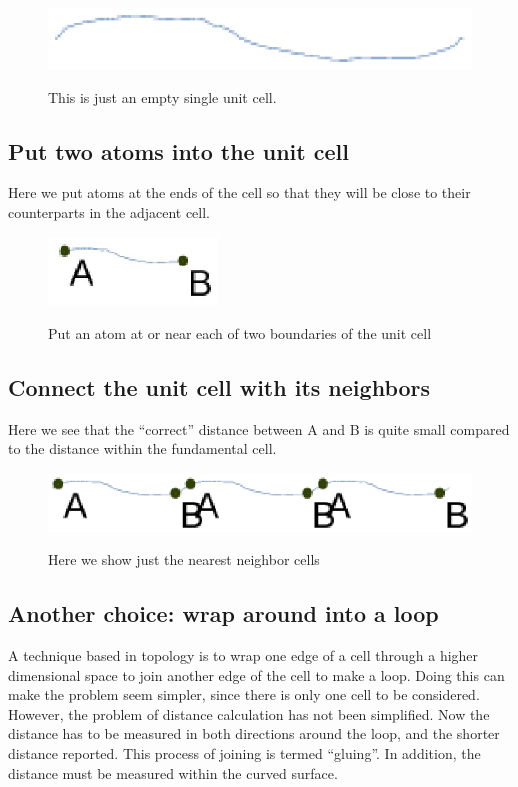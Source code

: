 \documentclass[preprint]{iucr}              %
\numberwithin{equation}{section}
\begin{document}
\begin{figure}
	\includegraphics[width=\textwidth]{line_1}
	\label{line_1}
	\caption{This is just an empty single unit cell.}
\end{figure}

\subsection{Put two atoms into the unit cell}
	
	Here we put atoms at the ends of the cell so that they
	will be close to their counterparts in the adjacent cell.
\begin{figure}
	\includegraphics[width=0.4\textwidth]{line_2a}
	\label{line_2}
	\caption{Put an atom at or near each of two boundaries of the unit cell}
\end{figure}

\subsection{Connect the unit cell with its neighbors}
	
	Here we see that the ``correct'' distance between A and B is
	quite small compared to the distance within the 
	fundamental cell.
\begin{figure}
	\includegraphics[width=\textwidth]{line_3}
	\label{line_3}
	\caption{Here we show just the nearest neighbor cells}
\end{figure}

\subsection{Another choice: wrap around into a loop}
	A technique based in topology is to wrap one edge of a
	cell through a higher dimensional space to join
	another edge of the cell to make a loop. Doing this can make the 
	problem seem simpler, since there is only one cell
	to be considered. However, the problem of distance calculation has
	not been simplified. Now the distance has to be measured
	in both directions around the loop, and the shorter distance
	reported. This process of joining is termed ``gluing''. In
	addition, the distance must be measured within the curved
	surface.
	
\end{document}
